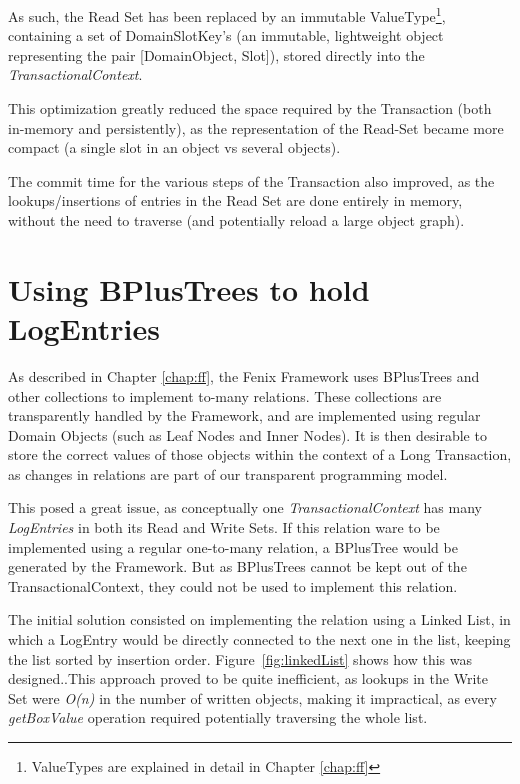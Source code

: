 As such, the Read Set has been replaced by an immutable
ValueType\footnote{ValueTypes are explained in detail in Chapter
  \ref{chap:ff}}, containing a set of DomainSlotKey's (an immutable,
lightweight object representing the pair [DomainObject, Slot]), stored
directly into the {\it TransactionalContext}.

This optimization greatly reduced the space required by the
Transaction (both in-memory and persistently), as the representation
of the Read-Set became more compact (a single slot in an object vs
several objects).

The commit time for the various steps of the Transaction also
improved, as the lookups/insertions of entries in the Read Set are
done entirely in memory, without the need to traverse (and
potentially reload a large object graph).

\section{Using BPlusTrees to hold LogEntries}

As described in Chapter \ref{chap:ff}, the Fenix Framework uses
BPlusTrees and other collections to implement to-many relations. These
collections are transparently handled by the Framework, and are
implemented using regular Domain Objects (such as Leaf Nodes and Inner
Nodes). It is then desirable to store the correct values of those
objects within the context of a Long Transaction, as changes in
relations are part of our transparent programming model.

This posed a great issue, as conceptually one {\it
  TransactionalContext} has many {\it LogEntries} in both its Read and
Write Sets. If this relation ware to be implemented using a regular
one-to-many relation, a BPlusTree would be generated by the
Framework. But as BPlusTrees cannot be kept out of the
TransactionalContext, they could not be used to implement this relation.

The initial solution consisted on implementing the relation using a
Linked List, in which a LogEntry would be directly connected to the
next one in the list, keeping the list sorted by insertion
order. Figure~\ref{fig:linkedList} shows how this was designed..This
approach proved to be quite inefficient, as lookups in the Write Set
were {\it O(n)} in the number of written objects, making it
impractical, as every {\it getBoxValue} operation required potentially
traversing the whole list.

